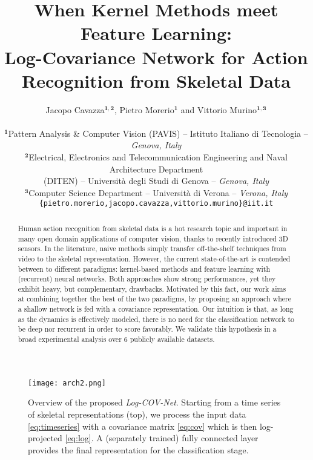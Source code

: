 \documentclass[10pt,twocolumn]{article}
\begin{document}
\title{When Kernel Methods meet Feature Learning: \\ Log-Covariance Network for Action Recognition from Skeletal Data}

\author{Jacopo Cavazza$^{\pmb{1},\pmb{2}}$, Pietro Morerio$^{\pmb 1}$ and Vittorio Murino$^{ \pmb{1},\pmb{3}}$\\ \\
	$^{\pmb 1}$Pattern Analysis \& Computer Vision (PAVIS) -- Istituto Italiano di Tecnologia -- \textit{Genova, Italy} \\
	$^{\pmb 2}$Electrical, Electronics and Telecommunication Engineering and Naval Architecture Department \\ (DITEN) -- Universit\`{a} degli Studi di Genova --  \textit{Genova, Italy}\\
	$^{\pmb 3}$Computer Science Department -- Universit\`{a} di Verona --  \textit{Verona, Italy} \\
	{\tt\small \{pietro.morerio,jacopo.cavazza,vittorio.murino\}@iit.it}}

\maketitle
\thispagestyle{empty}

\begin{abstract}


Human action recognition from skeletal data is a hot research topic and important in many open domain applications of computer vision, thanks to recently introduced 3D sensors. In the literature, naive methods simply transfer off-the-shelf techniques from video to the skeletal representation. However, the current state-of-the-art is contended between to different paradigms: kernel-based methods and feature learning with (recurrent) neural networks. Both approaches show strong performances, yet they exhibit heavy, but complementary, drawbacks. Motivated by this fact, our work aims at combining together the best of the two paradigms, by proposing an approach where a shallow network is fed with a  covariance representation. Our intuition is that, as long as the dynamics is effectively modeled, there is no need for the classification network to be deep nor recurrent in order to score favorably. We validate this hypothesis in a broad experimental analysis over 6 publicly available datasets.
\end{abstract}

\begin{figure}[t!]
	\centering
	\texttt{[image: arch2.png]}
	\caption{Overview of the proposed \textit{Log-COV-Net}. Starting from a time series of skeletal representations (top), we process the input data \eqref{eq:timeseries} with a covariance matrix \eqref{eq:cov} which is then log-projected \eqref{eq:log}. A (separately trained) fully connected layer provides the final representation for the classification stage.}
	\label{fig:pip}
\end{figure}
\end{document}
